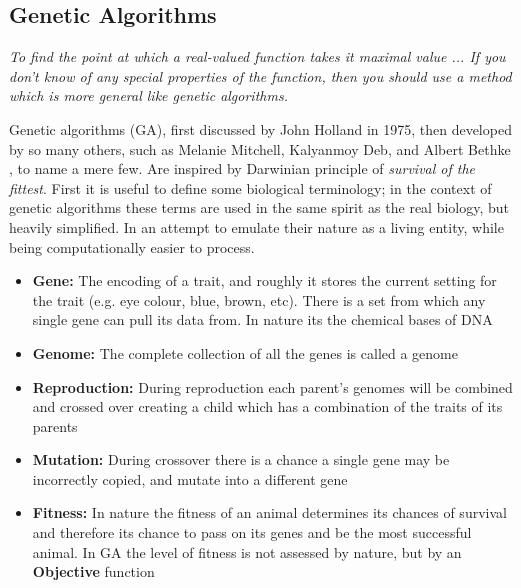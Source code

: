 \documentclass[11pt]{article}
\begin{document}
\subsection{Genetic Algorithms}\label{section:GA}

    \begin{displayquote} \textit {
        To find the point at which a real-valued function takes it maximal value ...
        If you don't know of any special properties of the function, then you
        should use a method which is more general like genetic algorithms.
    } \end{displayquote}

    Genetic algorithms (GA), first 
    discussed by John Holland \cite{Holland} in 1975, then developed by so many
    others, such as Melanie Mitchell, Kalyanmoy Deb, and Albert Bethke
    \cite{Mitchell, KalyanmoyDeb, Bethke}, to name a mere few. Are inspired by Darwinian
    principle of \textit{survival of the fittest}.
    First it is useful to define some biological terminology; in the context of
    genetic algorithms these terms are used in the same spirit as the real biology,
    but heavily simplified. In an attempt to emulate their nature as a living entity,
    while being computationally easier to process.

    \begin{itemize}
        \item{\textbf{Gene:} The encoding of a trait, and roughly it stores the current
            setting for the trait (e.g. eye colour, blue, brown, etc). There is a set
            from which any single gene can pull its data from. In nature its the chemical
            bases  of DNA}
        \item{\textbf{Genome:} The complete collection of all the genes is called a
            genome}
        \item{\textbf{Reproduction:} During reproduction each parent's genomes will be
            combined and crossed over creating a child which has a combination of
            the traits of its parents}
        \item{\textbf{Mutation:} During crossover there is a chance a single gene
            may be incorrectly copied, and mutate into a different gene}
        \item{\textbf{Fitness: } In nature the fitness of an animal determines
            its chances of survival and therefore its chance to pass on its genes
            and be the most successful animal. In GA the level of fitness is not assessed
            by nature, but by an \textbf{Objective} function}
    \end{itemize}
\end{document}
